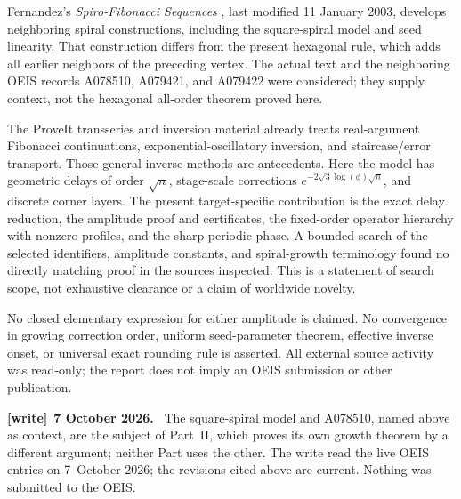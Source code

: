 \documentclass[11pt]{article}
\theoremstyle{remark}\newtheorem{remark}[theorem]{Remark}
\newenvironment{writenote}[1][]{\par\smallskip\begingroup\small
 \noindent\textbf{[write]}\if\relax\detokenize{#1}\relax\else~\textbf{#1.}\fi\ }%
 {\par\endgroup\smallskip}
\begin{document}
Fernandez's \emph{Spiro-Fibonacci Sequences} \cite{fernandez}, last modified 11 January 2003, develops neighboring spiral constructions, including the square-spiral model and seed linearity. That construction differs from the present hexagonal rule, which adds all earlier neighbors of the preceding vertex. The actual text and the neighboring OEIS records A078510, A079421, and A079422 were considered; they supply context, not the hexagonal all-order theorem proved here.

The ProveIt transseries and inversion material \cite{proveit} already treats real-argument Fibonacci continuations, exponential-oscillatory inversion, and staircase/error transport. Those general inverse methods are antecedents. Here the model has geometric delays of order $\sqrt n$, stage-scale corrections $e^{-2\sqrt3\log(\phi)\sqrt n}$, and discrete corner layers. The present target-specific contribution is the exact delay reduction, the amplitude proof and certificates, the fixed-order operator hierarchy with nonzero profiles, and the sharp periodic phase. A bounded search of the selected identifiers, amplitude constants, and spiral-growth terminology found no directly matching proof in the sources inspected. This is a statement of search scope, not exhaustive clearance or a claim of worldwide novelty.

No closed elementary expression for either amplitude is claimed. No convergence in growing correction order, uniform seed-parameter theorem, effective inverse onset, or universal exact rounding rule is asserted. All external source activity was read-only; the report does not imply an OEIS submission or other publication.

\begin{writenote}[7 October 2026]
The square-spiral model and A078510, named above as context, are the subject of Part~II, which proves its own growth theorem by a different argument; neither Part uses the other. The write read the live OEIS entries on 7~October 2026; the revisions cited above are current. Nothing was submitted to the OEIS.
\end{writenote}
\end{document}
